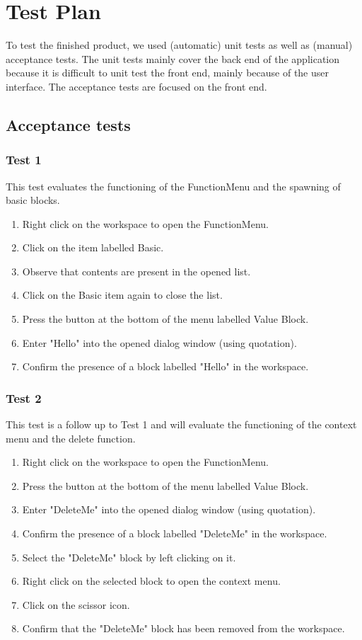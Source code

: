 \chapter{Test Plan}

To test the finished product, we used (automatic) unit tests as well as (manual) acceptance tests.
The unit tests mainly cover the back end of the application because it is difficult to unit test the front end, mainly because of the user interface.
The acceptance tests are focused on the front end.

\section{Acceptance tests} \label{acceptance tests}
	\subsection{Test 1}
		This test evaluates the functioning of the FunctionMenu and the spawning of basic blocks.
		
		\begin{enumerate}
			\item Right click on the workspace to open the FunctionMenu.
			\item Click on the item labelled Basic.
			\item Observe that contents are present in the opened list.
			\item Click on the Basic item again to close the list.
			\item Press the button at the bottom of the menu labelled Value Block.
			\item Enter "Hello" into the opened dialog window (using quotation).
			\item Confirm the presence of a block labelled "Hello" in the workspace.
		\end{enumerate}
		
	\subsection{Test 2}
		This test is a follow up to Test 1 and will evaluate the functioning of the context menu
		and the delete function.
		
		\begin{enumerate}
			\item Right click on the workspace to open the FunctionMenu.
			\item Press the button at the bottom of the menu labelled Value Block.
			\item Enter "DeleteMe" into the opened dialog window (using quotation).
			\item Confirm the presence of a block labelled "DeleteMe" in the workspace.
			\item Select the "DeleteMe" block by left clicking on it.
			\item Right click on the selected block to open the context menu.
			\item Click on the scissor icon.
			\item Confirm that the "DeleteMe" block has been removed from the workspace.
		\end{enumerate}
		
